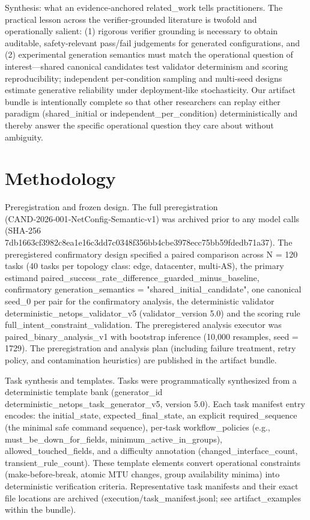 \documentclass[conference]{IEEEtran}
\begin{document}
Synthesis: what an evidence‑anchored related\_work tells practitioners. The practical lesson across the verifier‑grounded literature is twofold and operationally salient: (1) rigorous verifier grounding is necessary to obtain auditable, safety‑relevant pass/fail judgements for generated configurations, and (2) experimental generation semantics must match the operational question of interest---shared canonical candidates test validator determinism and scoring reproducibility; independent per‑condition sampling and multi‑seed designs estimate generative reliability under deployment‑like stochasticity. Our artifact bundle is intentionally complete so that other researchers can replay either paradigm (shared\_initial or independent\_per\_condition) deterministically and thereby answer the specific operational question they care about without ambiguity.

\section{Methodology}
Preregistration and frozen design. The full preregistration (CAND‑2026‑001‑NetConfig‑Semantic‑v1) was archived prior to any model calls (SHA‑256 7db1663cf3982c8ea1e16c3dd7c0348f356bb4cbe3978ecc75bb59fdedb71a37). The preregistered confirmatory design specified a paired comparison across N = 120 tasks (40 tasks per topology class: edge, datacenter, multi‑AS), the primary estimand paired\_success\_rate\_difference\_guarded\_minus\_baseline, confirmatory generation\_semantics = "shared\_initial\_candidate", one canonical seed\_0 per pair for the confirmatory analysis, the deterministic validator deterministic\_netops\_validator\_v5 (validator\_version 5.0) and the scoring rule full\_intent\_constraint\_validation. The preregistered analysis executor was paired\_binary\_analysis\_v1 with bootstrap inference (10,000 resamples, seed = 1729). The preregistration and analysis plan (including failure treatment, retry policy, and contamination heuristics) are published in the artifact bundle.

Task synthesis and templates. Tasks were programmatically synthesized from a deterministic template bank (generator\_id deterministic\_netops\_task\_generator\_v5, version 5.0). Each task manifest entry encodes: the initial\_state, expected\_final\_state, an explicit required\_sequence (the minimal safe command sequence), per‑task workflow\_policies (e.g., must\_be\_down\_for\_fields, minimum\_active\_in\_groups), allowed\_touched\_fields, and a difficulty annotation (changed\_interface\_count, transient\_rule\_count). These template elements convert operational constraints (make‑before‑break, atomic MTU changes, group availability minima) into deterministic verification criteria. Representative task manifests and their exact file locations are archived (execution/task\_manifest.jsonl; see artifact\_examples within the bundle).
\end{document}
